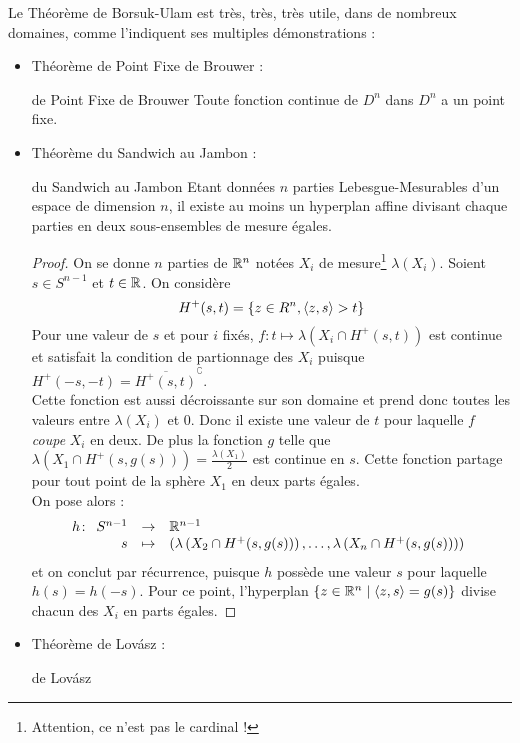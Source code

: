 \documentclass{cours}
\begin{document}
Le Théorème de Borsuk-Ulam est très, très, très utile, dans de nombreux domaines, comme l'indiquent ses multiples démonstrations\! :
\begin{itemize}
\item Théorème de Point Fixe de Brouwer\! :
\begin{théorème}{de Point Fixe de Brouwer}{}
Toute fonction continue de $D^{n}$ dans $D^{n}$ a un point fixe.
\end{théorème}

\item Théorème du Sandwich au Jambon\! :
\begin{théorème}{du Sandwich au Jambon}{}
Etant données $n$ parties Lebesgue-Mesurables d'un espace de dimension $n$, il existe au moins un hyperplan affine divisant chaque parties en deux sous-ensembles de mesure égales.
\end{théorème}
\begin{proof}
    On se donne $n$ parties de $\mathbb{R}^{n}$ notées $X_{i}$ de mesure\footnote{Attention, ce n'est pas le cardinal !} $\lambda\left(X_{i}\right)$. Soient $s \in S^{n - 1}$ et $t\in \mathbb{R}$. On considère
    \[
        H^{+}(s, t) = \left\{z \in R^{n}, \left\langle z, s \right\rangle > t\right\}
    \]
    Pour une valeur de $s$ et pour $i$ fixés, $f\! : t \mapsto \lambda\left(X_{i} \cap H^{+}(s, t)\right)$ est continue et satisfait la condition de partionnage des $X_{i}$ puisque $H^{+}(-s, -t) = \overline{H^{+}(s, t)}^{\complement}$.\\
    Cette fonction est aussi décroissante sur son domaine et prend donc toutes les valeurs entre $\lambda\left(X_{i}\right)$ et $0$. Donc il existe une valeur de $t$ pour laquelle $f$ \textit{coupe} $X_{i}$ en deux. De plus la fonction $g$ telle que $\lambda\left(X_{1}\cap H^{+}(s, g(s))\right) = \frac{\lambda\left(X_{1}\right)}{2}$ est continue en $s$. Cette fonction partage pour tout point de la sphère $X_{1}$ en deux parts égales. \\
    On pose alors\! :
    \[
        h\! : \begin{array}[t]{rcl} S^{n - 1} & \to & \mathbb{R}^{n - 1} \\ s & \mapsto & \left(\lambda\left(X_{2} \cap H^{+}(s, g(s))\right), \ldots, \lambda\left(X_{n} \cap H^{+}(s, g(s))\right)\right) \end{array}
    \]
    et on conclut par récurrence, puisque $h$ possède une valeur $s$ pour laquelle $h(s) = h(-s)$. Pour ce point, l'hyperplan $\left\{z \in \mathbb{R}^{n} \mid \left\langle z, s \right\rangle = g(s)\right\}$ divise chacun des $X_{i}$ en parts égales.
\end{proof}
\item Théorème de Lovász\! :
\begin{théorème}{de Lovász}{}

\end{théorème}
\end{itemize}
\end{document}
